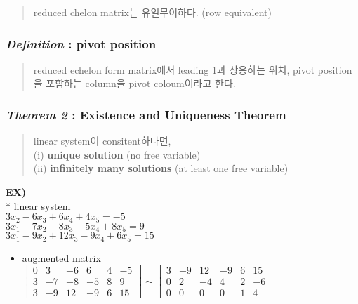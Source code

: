 \documentclass[11pt]{article}
\providecommand{\tightlist}{%
      \setlength{\itemsep}{0pt}\setlength{\parskip}{0pt}}
\begin{document}
\begin{quote}
reduced chelon matrix는 유일무이하다. (row equivalent)
\end{quote}

    \hypertarget{definition-pivot-position}{%
\subsubsection{\texorpdfstring{\emph{Definition} : pivot
position}{Definition : pivot position}}\label{definition-pivot-position}}

\begin{quote}
reduced echelon form matrix에서 leading 1과 상응하는 위치, pivot
position을 포함하는 column을 pivot coloum이라고 한다.
\end{quote}

    \hypertarget{theorem-2-existence-and-uniqueness-theorem}{%
\subsubsection{\texorpdfstring{\emph{Theorem 2} : Existence and
Uniqueness
Theorem}{Theorem 2 : Existence and Uniqueness Theorem}}\label{theorem-2-existence-and-uniqueness-theorem}}

\begin{quote}
linear system이 consitent하다면,\\
(i) \textbf{unique solution} (no free variable)\\
(ii) \textbf{infinitely many solutions} (at least one free variable)
\end{quote}

\textbf{EX)}\\
* linear system\\
\(3x_{2} - 6x_{3} + 6x_{4} + 4x_{5} = -5\)\\
\(3x_{1} - 7x_{2} - 8x_{3} - 5x_{4} + 8x_{5} = 9\)\\
\(3x_{1} - 9x_{2} + 12x_{3} - 9x_{4} + 6x_{5} = 15\)

\begin{itemize}
\tightlist
\item
  augmented matrix\\
  \(\begin{bmatrix} 0 & 3 & -6 & 6 & 4 & -5 \\ 3 & -7 & -8 & -5 & 8 & 9 \\ 3 & -9 & 12 & -9 & 6 & 15\end{bmatrix}\sim \begin{bmatrix} 3 & -9 & 12 & -9 & 6 & 15 \\ 0 & 2 & -4 & 4 & 2 & -6 \\ 0 & 0 & 0 & 0 & 1 & 4 \end{bmatrix}\)
\end{itemize}
\end{document}
